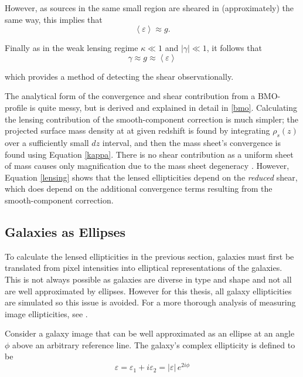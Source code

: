 \documentclass[%
 reprint,
 amsmath,amssymb,
 aps,nofootinbib
]{revtex4-1}
\begin{document}
\noindent However, as sources in the same small region are sheared in (approximately) the same way, this implies that
\begin{equation}
\left<\varepsilon\right>\approx g.
\end{equation}

 \noindent Finally as in the weak lensing regime ${\kappa\ll1}$ and ${|\gamma|\ll1}$, it follows that
 \begin{equation}
 \gamma\approx g\approx\left<\varepsilon\right>
 \end{equation}

 \noindent which provides a method of detecting the shear observationally.

 The analytical form of the convergence and shear contribution from a BMO-profile is quite messy, but is derived and explained in detail in \ref{bmo}. Calculating the lensing contribution of the smooth-component correction is much simpler; the projected surface mass density at at given redshift is found by integrating $\rho_s(z)$ over a sufficiently small $dz$ interval, and then the mass sheet's convergence is found using Equation \eqref{kappa}. There is no shear contribution as a uniform sheet of mass causes only magnification due to the mass sheet degeneracy \cite{??}. However, Equation \eqref{lensing} shows that the lensed ellipticities depend on the \textit{reduced} shear, which does depend on the additional convergence terms resulting from the smooth-component correction.

\subsection{Galaxies as Ellipses} \label{galaxies_as_ellipses}

To calculate the lensed ellipticities in the previous section, galaxies must first be translated from pixel intensities into elliptical representations of the galaxies. This is not always possible as galaxies are diverse in type and shape and not all are well approximated by ellipses. However for this thesis, all galaxy ellipticities are simulated so this issue is avoided. For a more thorough analysis of measuring image ellipticities, see \cite{schneider}.

Consider a galaxy image that can be well approximated as an ellipse at an angle $\phi$ above an arbitrary reference line. The galaxy's complex ellipticity is defined to be
\begin{equation}\label{complex_ellipticity}
\varepsilon=\varepsilon_1+i\varepsilon_2=|\varepsilon|\,e^{2i\phi}
\end{equation}
\end{document}
